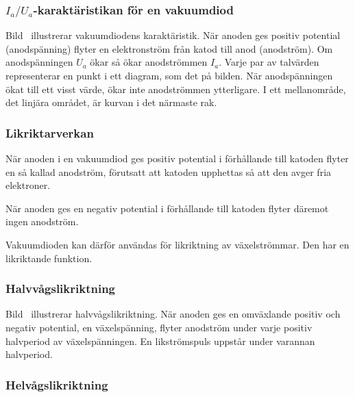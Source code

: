 \subsubsection{\(I_a/U_a\)-karaktäristikan för en vakuumdiod}


Bild~ illustrerar vakuumdiodens karaktäristik.
När anoden ges positiv potential (anodspänning) flyter en elektronström från
katod till anod (anodström).
Om anodspänningen \(U_a\) ökar så ökar anodströmmen \(I_a\).
Varje par av talvärden representerar en punkt i ett diagram, som det på bilden.
När anodspänningen ökat till ett visst värde, ökar inte anodströmmen
ytterligare.
I ett mellanområde, det linjära området, är kurvan i det närmaste rak.

\subsubsection{Likriktarverkan}

När anoden i en vakuumdiod ges positiv potential i förhållande till katoden
flyter en så kallad anodström, förutsatt att katoden upphettas så att den avger
fria elektroner.

När anoden ges en negativ potential i förhållande till katoden flyter däremot
ingen anodström.

Vakuumdioden kan därför användas för likriktning av växelströmmar.
Den har en likriktande funktion.

\subsubsection{Halvvågslikriktning}

Bild~ illustrerar halvvågslikriktning.
När anoden ges en omväxlande positiv och negativ potential, en växelspänning,
flyter anodström under varje positiv halvperiod av växelspänningen.
En likströmspuls uppstår under varannan halvperiod.


\subsubsection{Helvågslikriktning}

